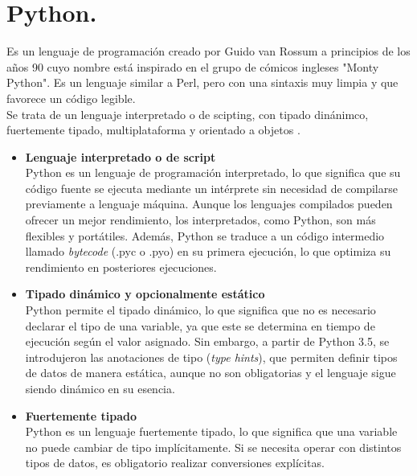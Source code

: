 \section*{\fontsize{12}{18}\selectfont Python.}

\begin{justify}
    Es un lenguaje de programación creado por Guido van Rossum a principios de los años 90
    cuyo nombre está inspirado en el grupo de cómicos ingleses "Monty Python". Es un lenguaje
    similar a Perl, pero con una sintaxis muy limpia y que favorece un código legible.\\

    Se trata de un lenguaje interpretado o de scipting, con tipado dinánimco, fuertemente tipado, multiplataforma
    y orientado a objetos \parencite{gonzalez2011python}.

    \begin{itemize}
        \item \textbf{Lenguaje interpretado o de script}\\
        Python es un lenguaje de programación interpretado, lo que significa que su código fuente se ejecuta mediante
        un intérprete sin necesidad de compilarse previamente a lenguaje máquina. Aunque los lenguajes compilados pueden
        ofrecer un mejor rendimiento, los interpretados, como Python, son más flexibles y portátiles. Además, Python se
        traduce a un código intermedio llamado \textit{bytecode} (.pyc o .pyo) en su primera ejecución,
        lo que optimiza su rendimiento en posteriores ejecuciones.
        
        \item \textbf{Tipado dinámico y opcionalmente estático}\\
        Python permite el tipado dinámico, lo que significa que no es necesario declarar el tipo de una variable, ya que este se
        determina en tiempo de ejecución según el valor asignado. Sin embargo, a partir de Python 3.5, se introdujeron las anotaciones
        de tipo (\textit{type hints}), que permiten definir tipos de datos de manera estática, aunque no son obligatorias y el lenguaje
        sigue siendo dinámico en su esencia.
        
        \item \textbf{Fuertemente tipado}\\
        Python es un lenguaje fuertemente tipado, lo que significa que una variable no puede cambiar de tipo implícitamente. Si se necesita
        operar con distintos tipos de datos, es obligatorio realizar conversiones explícitas.
        

\end{itemize}
\end{justify}
